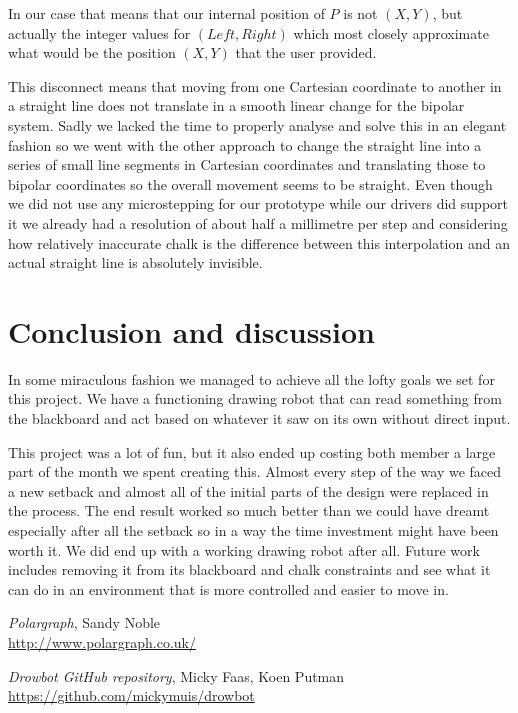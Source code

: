 \documentclass[12pt]{article}
\begin{document}
In our case that means that our internal position of $P$ is not
$(X,Y)$, but actually the integer values for $(Left,Right)$
which most closely approximate what would be the position $(X,Y)$
that the user provided.

This disconnect means that moving from one Cartesian coordinate
to another in a straight line does not translate in a smooth linear
change for the bipolar system.
Sadly we lacked the time to properly analyse and solve this in an
elegant fashion so we went with the other approach to change the
straight line into a series of small line segments in Cartesian
coordinates and translating those to bipolar coordinates so the
overall movement seems to be straight.
Even though we did not use any microstepping for our prototype
while our drivers did support it we already had a resolution of
about half a millimetre per step and considering how relatively
inaccurate chalk is the difference between this interpolation
and an actual straight line is absolutely invisible.

\section{Conclusion and discussion}
\label{sec:conclusion}

In some miraculous fashion we managed to achieve all the lofty goals
we set for this project.
We have a functioning drawing robot that can read something from
the blackboard and act based on whatever it saw on its own without
direct input.

This project was a lot of fun, but it also ended up costing both
member a large part of the month we spent creating this.
Almost every step of the way we faced a new setback and almost all
of the initial parts of the design were replaced in the process.
The end result worked so much better than we could have dreamt
especially after all the setback so in a way the time investment
might have been worth it.
We did end up with a working drawing robot after all.
Future work includes removing it from its blackboard and chalk
constraints and see what it can do in an environment that is
more controlled and easier to move in.


\begin{thebibliography}{9}

  \textit{Polargraph}, Sandy Noble
  \\\url{http://www.polargraph.co.uk/}

  \textit{Drowbot GitHub repository}, Micky Faas, Koen Putman
  \\\url{https://github.com/mickymuis/drowbot}

\end{thebibliography}
\end{document}
